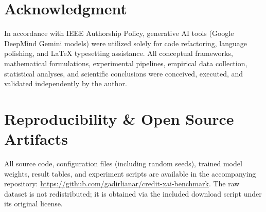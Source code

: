 \documentclass[conference]{IEEEtran}
\begin{document}
\section*{Acknowledgment}
In accordance with IEEE Authorship Policy, generative AI tools (Google DeepMind Gemini models) were utilized solely for code refactoring, language polishing, and LaTeX typesetting assistance. All conceptual frameworks, mathematical formulations, experimental pipelines, empirical data collection, statistical analyses, and scientific conclusions were conceived, executed, and validated independently by the author.

\section*{Reproducibility \& Open Source Artifacts}
All source code, configuration files (including random seeds), trained model weights, result tables, and experiment scripts are available in the accompanying repository: \url{https://github.com/gadirlianar/credit-xai-benchmark}. The raw dataset is not redistributed; it is obtained via the included download script under its original license.



\end{document}
